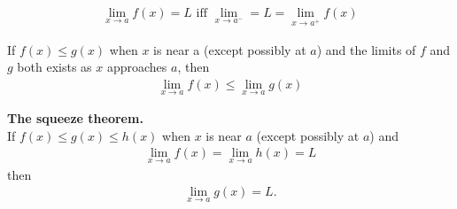 \documentclass{article}
\begin{document}
\begin{theorem}
    \begin{align*}
        \lim_{x\to a} f(x) = L\text{ iff } \lim_{x\to a^-}=L=\lim_{x\to a^+} f(x)
    \end{align*}
\end{theorem}
\begin{theorem}
    If $f(x) \leq g(x)$ when $x$ is near a (except possibly at $a$) and the limits of $f$ and $g$ both exists as $x$ approaches $a$, then
    \begin{align*}
        \lim_{x\to a}f(x) \leq \lim_{x\to a} g(x)
    \end{align*}
\end{theorem}
\begin{theorem}
    \textbf{The squeeze theorem.}\\
    If $f(x)\leq g(x)\leq h(x)$ when $x$ is near $a$ (except possibly at $a$) and
    \begin{align*}
        \lim_{x\to a}f(x) = \lim_{x\to a}h(x) = L
    \end{align*}
    then
    \begin{align*}
        \lim_{x \to a}g(x) = L.
    \end{align*}
\end{theorem}
\end{document}
